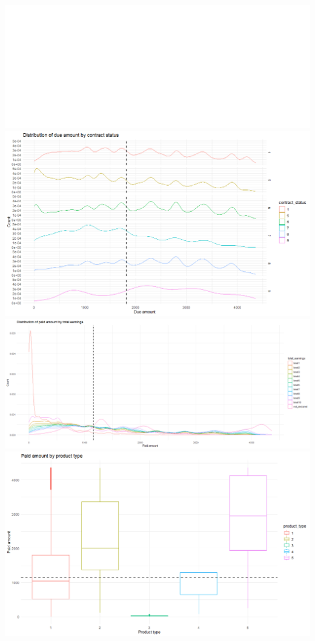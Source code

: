 \documentclass[
]{article}
\begin{document}
\includegraphics{Dependence of paid amount on gender, product type and business discount.svg}
\includegraphics{Distribution of due amount by contract status.png}
\includegraphics{Distribution of paid amount according to total earnings.png}
\includegraphics{Paid amount by product type.png}
\end{document}
